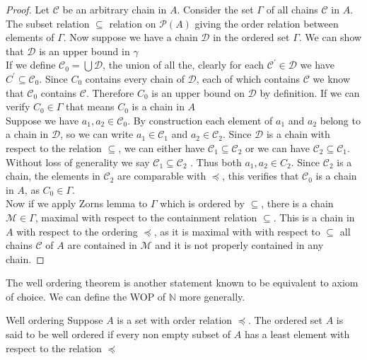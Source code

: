 \documentclass[16pt,a4paper]{article}
\theoremstyle{definition}
\begin{document}
\begin{proof}
Let $\mathcal{C}$ be an arbitrary chain in $A$. Consider the set $\Gamma$ of all chains $\mathcal{C}$ in $A$. The subset relation $\subseteq$ relation on $\mathcal{P}(A)$ giving the order relation between elements of $\Gamma$. Now suppose we have a chain $\mathcal{D}$ in the ordered set $\Gamma$. We can show that $\mathcal{D}$ is an upper bound in $\gamma$
\\

If we define $\mathcal{C}_0 = \bigcup \mathcal{D}$, the union of all the, clearly for each $\mathcal{C}^\prime \in \mathcal{D}$ we have $C^\prime \subseteq \mathcal{C}_0$. Since $C_0$ contains every chain of $\mathcal{D}$, each of which contains $\mathcal{C}$ we know that $\mathcal{C}_0$ contains $\mathcal{C}$. Therefore $C_0$ is an upper bound on $\mathcal{D}$ by definition. If we can verify $C_0 \in \Gamma $ that means $C_0$ is a chain in $A$
\\

Suppose we have  $a_1, a_2 \in \mathcal{C}_0$. By construction each element of $a_1$ and $a_2$ belong to a chain in $\mathcal{D}$, so we can write $a_1 \in \mathcal{C}_1$ and $a_2 \in \mathcal{C}_2$. Since $\mathcal{D}$ is a chain with respect to the relation $\subseteq$, we can either have $\mathcal{C}_1\subseteq \mathcal{C}_2$ or we can have $\mathcal{C}_2\subseteq \mathcal{C}_1$. Without loss of generality we say $\mathcal{C}_1\subseteq \mathcal{C}_2$ . Thus both $a_1, a_2 \in C_2$. Since $\mathcal{C}_2$ is a chain, the elements in $\mathcal{C}_2$ are comparable with $\preceq$, this verifies that $\mathcal{C}_0$ is a chain in $A$, as $C_0 \in \Gamma$. 
\\

Now if we apply Zorns lemma to $\Gamma$ which is ordered by $\subseteq$, there is a chain $\mathcal{M} \in \Gamma$, maximal with respect to the containment relation $\subseteq$. This is a chain in $A$ with respect to the ordering $\preceq$, as it is maximal with with respect to $\subseteq$ all chains $\mathcal{C}$ of $A$ are contained in $\mathcal{M}$ and it is not properly contained in any chain.  


\end{proof}




\newpage
The well ordering theorem is another statement known to be equivalent to axiom of choice. We can define the WOP of $\mathbb{N}$ more generally. 
\begin{defn}{Well ordering}{}
Suppose $A$ is a set with order relation $\preceq$. The ordered set $A$ is said to be well ordered if every non empty subset of $A$ has a least element with respect to the relation $\preceq$
\end{defn}
\end{document}
